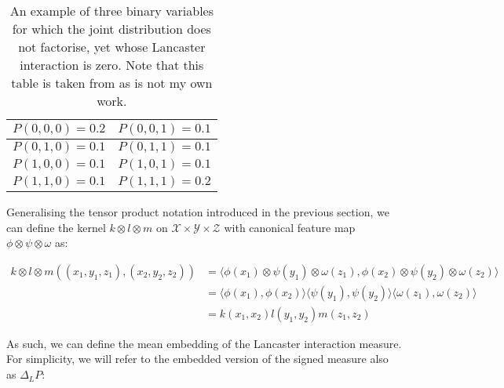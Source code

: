 \documentclass[12pt]{article}
\numberwithin{claim}{section}
\numberwithin{lemma}{section}
\numberwithin{theorem}{section}
\begin{document}
\begin{table}
\caption{\label{tab:lancaster_vanish}{\footnotesize An example of three binary variables for which the joint distribution does not factorise, yet whose Lancaster interaction is zero. Note that this table is taken from \cite{sejdinovic2013kernel} as is not my own work.}}


\centering{}{\small }%
\begin{tabular}{|c||c|}
\hline 
{\small $P(0,0,0)=0.2$} & {\small $P(0,0,1)=0.1$}\tabularnewline
\hline 
{\small $P(0,1,0)=0.1$} & {\small $P(0,1,1)=0.1$}\tabularnewline
\hline 
\hline 
{\small $P(1,0,0)=0.1$} & {\small $P(1,0,1)=0.1$}\tabularnewline
\hline 
{\small $P(1,1,0)=0.1$} & {\small $P(1,1,1)=0.2$}\tabularnewline
\hline 
\end{tabular}
\end{table}


Generalising the tensor product notation introduced in the previous section, we can define the kernel $k\otimes l \otimes m$ on $\mathcal{X} \times \mathcal{Y} \times \mathcal{Z}$ with canonical feature map $\phi \otimes \psi \otimes \omega$ as:

\begin{align*}
k\otimes l \otimes m((x_1,y_1,z_1) ,(x_2,y_2,z_2) ) &=  \langle \phi(x_1)\otimes \psi(y_1) \otimes \omega(z_1) ,\phi(x_2)\otimes \psi(y_2) \otimes \omega(z_2) \rangle \\
& =  \langle \phi(x_1) , \phi(x_2) \rangle \langle \psi(y_1) , \psi(y_2) \rangle \langle \omega(z_1) , \omega(z_2) \rangle \\
&= k(x_1,x_2)l(y_1 ,y_2)m(z_1,z_2) 
\end{align*}

As such, we can define the mean embedding of the Lancaster interaction measure. For simplicity, we will refer to the embedded version of the signed measure also as $\Delta_LP$:
\end{document}
